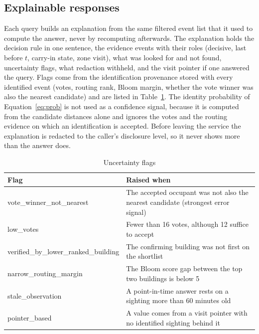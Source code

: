 \documentclass[12pt,a4paper,oneside]{report}
\begin{document}
\subsection{Explainable responses}
Each query builds an explanation from the same filtered event list that it used to compute the answer, never by recomputing afterwards. The explanation holds the decision rule in one sentence, the evidence events with their roles (decisive, last before $t$, carry-in state, zone visit), what was looked for and not found, uncertainty flags, what redaction withheld, and the visit pointer if one answered the query. Flags come from the identification provenance stored with every identified event (votes, routing rank, Bloom margin, whether the vote winner was also the nearest candidate) and are listed in Table~\ref{tab:flags}. The identity probability of Equation~\ref{eq:prob} is not used as a confidence signal, because it is computed from the candidate distances alone and ignores the votes and the routing evidence on which an identification is accepted. Before leaving the service the explanation is redacted to the caller's disclosure level, so it never shows more than the answer does.

\begin{table}[htbp]
\centering
\caption{Uncertainty flags}\label{tab:flags}
{\small\setlength{\tabcolsep}{4pt}\renewcommand{\arraystretch}{1.2}
\begin{tabular}{|p{4.59cm}|p{9.99cm}|}\hline
\textbf{Flag} & \textbf{Raised when}\\\hline
vote\_\allowbreak winner\_\allowbreak not\_\allowbreak nearest & The accepted occupant was not also the nearest candidate (strongest error signal)\\\hline
low\_\allowbreak votes & Fewer than 16 votes, although 12 suffice to accept\\\hline
verified\_\allowbreak by\_\allowbreak lower\_\allowbreak ranked\_\allowbreak building & The confirming building was not first on the shortlist\\\hline
narrow\_\allowbreak routing\_\allowbreak margin & The Bloom score gap between the top two buildings is below 5\\\hline
stale\_\allowbreak observation & A point-in-time answer rests on a sighting more than 60 minutes old\\\hline
pointer\_\allowbreak based & A value comes from a visit pointer with no identified sighting behind it\\\hline
\end{tabular}}
\end{table}
\end{document}
